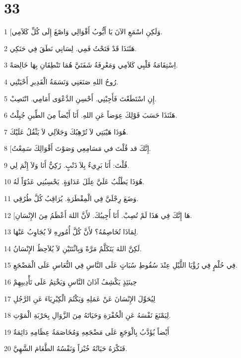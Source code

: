 \chapter{33}

\par 1 [وَلَكِنِ اسْمَعِ الآنَ يَا أَيُّوبُ أَقْوَالِي وَاصْغَ إِلَى كُلِّ كَلاَمِي.
\par 2 هَئَنَذَا قَدْ فَتَحْتُ فَمِي. لِسَانِي نَطَقَ فِي حَنَكِي.
\par 3 اِسْتِقَامَةُ قَلْبِي كَلاَمِي وَمَعْرِفَةُ شَفَتَيَّ هُمَا تَنْطِقَانِ بِهَا خَالِصَةً.
\par 4 رُوحُ اللهِ صَنَعَنِي وَنَسَمَةُ الْقَدِيرِ أَحْيَتْنِي.
\par 5 إِنِ اسْتَطَعْتَ فَأَجِبْنِي. أَحْسِنِ الدَّعْوَى أَمَامِي. انْتَصِبْ.
\par 6 هَئَنَذَا حَسَبَ قَوْلِكَ عِوَضاً عَنِ اللهِ. أَنَا أَيْضاً مِنَ الطِّينِ جُبِلْتُ.
\par 7 هُوَذَا هَيْبَتِي لاَ تُرْهِبُكَ وَجَلاَلِي لاَ يَثْقُلُ عَلَيْكَ.
\par 8 [إِنَّكَ قد قُلْتَ في مَسَامِعِي وَصَوْتَ أَقْوَالِكَ سَمِعْتُ.
\par 9 قُلْتَ: أَنَا بَرِيءٌ بِلاَ ذَنْبٍ. زَكِيٌّ أَنَا وَلاَ إِثْمَ لِي.
\par 10 هُوَذَا يَطْلُبُ عَلَيَّ عِلَلَ عَدَاوَةٍ. يَحْسِبُنِي عَدُوّاً لَهُ.
\par 11 وَضَعَ رِجْلَيَّ فِي الْمِقْطَرَةِ. يُرَاقِبُ كُلَّ طُرُقِي.
\par 12 [هَا إِنَّكَ فِي هَذَا لَمْ تُصِبْ. أَنَا أُجِيبُكَ. لأَنَّ اللهَ أَعْظَمُ مِنَ الإِنْسَانِ.
\par 13 لِمَاذَا تُخَاصِمُهُ؟ لأَنَّ كُلَّ أُمُورِهِ لاَ يُجَاوِبُ عَنْهَا.
\par 14 لَكِنَّ اللهَ يَتَكَلَّمُ مَرَّةً وَبِاثْنَتَيْنِ لاَ يُلاَحِظُ الإِنْسَانُ.
\par 15 فِي حُلْمٍ فِي رُؤْيَا اللَّيْلِ عِنْدَ سُقُوطِ سُبَاتٍ عَلَى النَّاسِ فِي النُّعَاسِ عَلَى الْمَضْجَعِ.
\par 16 حِينَئِذٍ يَكْشِفُ آذَانَ النَّاسِ وَيَخْتِمُ عَلَى تَأْدِيبِهِمْ
\par 17 لِيُحَوِّلَ الإِنْسَانَ عَنْ عَمَلِهِ وَيَكْتُمَ الْكِبْرِيَاءَ عَنِ الرَّجُلِ
\par 18 لِيَمْنَعَ نَفْسَهُ عَنِ الْحُفْرَةِ وَحَيَاتَهُ مِنَ الزَّوَالِ بِحَرْبَةِ الْمَوْتِ.
\par 19 أَيْضاً يُؤَدَّبُ بِالْوَجَعِ عَلَى مَضْجَعِهِ وَمُخَاصَمَةُ عِظَامِهِ دَائِمَةٌ
\par 20 فَتَكْرَهُ حَيَاتُهُ خُبْزاً وَنَفْسُهُ الطَّعَامَ الشَّهِيَّ.
